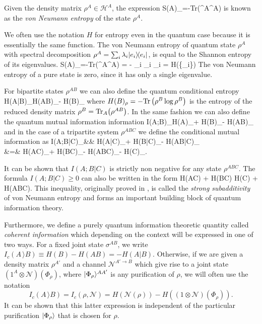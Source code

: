 \documentclass[aps,11pt,twoside,letterpaper]{article}
\def\Tr{\textup{Tr}}
\def\cH{\mathcal{H}}
\newcommand{\mcal}{\mathcal}
\begin{document}
		\begin{definition} 
			Given the density matrix $\rho^A \in \cH^A$, the expression
			\be
				S(A)_\rho=-\Tr\left(\rho^A\log\rho^A\right)
			\ee
			is known as the \emph{von Neumann entropy} of the state $\rho^A$. 
		\end{definition}
		
	            We often use the notation $H$ for entropy even in the quantum case because it is essentially
	            the same function.
	            The von Neumann entropy of quantum state $\rho^A$ 
	            with spectral decomposition $\rho^A = \sum_i \lambda_i | e_i \rangle\!\langle e_i |$, is
	            equal to the Shannon entropy of its eigenvalues.
	            \be
		            S(A)_\rho=-\Tr\left(\rho^A\log\rho^A\right) = - \sum_i \lambda_i \log \lambda_i = H(\{\lambda_i\})
	            \ee
  		   The von Neumann entropy of a pure state is zero, since it has only a single eigenvalue.

			
			For bipartite states $\rho^{AB}$ we can also define the quantum conditional entropy
			\be
				H(A|B)_\rho 	\triangleq 		H(AB)_\rho - H(B)_\rho					\label{cond-entrpy} 
			\ee
			where $H(B)_\rho = -\Tr\left(\rho^B\log\rho^B\right)$ is the entropy of the reduced density matrix
			$\rho^B = \Tr_A\!\left( \rho^{AB}\right)$. In the same fashion we can also define the 
			quantum mutual information information
			\be
				I(A;B)_\rho 	\triangleq		H(A)_\rho + H(B)_\rho - H(AB)_\rho 
			\ee
			and in the case of a tripartite system $\rho^{ABC}$ we define the conditional mutual information 
			as 
			\bea
				I(A;B|C)_\rho 	&\triangleq&	H(A|C)_\rho + H(B|C)_\rho - H(AB|C)_\rho \label{cond-mut-info} \\
								&=&		H(AC)_\rho + H(BC)_\rho - H(ABC)_\rho - H(C)_\rho.
			\eea
		    
			\noindent It can be shown that $I(A;B|C)$ is strictly non negative for any state $\rho^{ABC}$.
			The formula $I(A;B|C)\geq 0$ can also be written in the form
			\be	\label{strong-subadditivity}
				H(AC) + H(BC) 	\geq	H(C) + H(ABC).
			\ee
			This inequality, originally proved in \cite{LR73}, is called the \emph{strong subadditivity} of von Neumann 
			entropy and forms an important building block of quantum information theory.
			
			
			Furthermore, we define a purely quantum information theoretic quantity called \emph{coherent information}
			which depending on the context will be expressed in one of two ways.
			For a fixed joint state $\sigma^{AB}$, we write
			$I_c(A\,\rangle B) \equiv H(B) - H(AB) = -H(A|B).$
			Otherwise, if we are given a density matrix $\rho^{A'}$ and a channel $\mcal{N}^{A'\rightarrow B}$ which give rise to a joint state 
			$(1^A\otimes \mcal{N})(\Phi_\rho)$,
			where $| \Phi_\rho \rangle^{AA'}$ is any purification of $\rho$, we will often use the notation
			\[I_c(A\,\rangle B) = I_c(\rho,\mcal{N}) = H(\mcal{N}(\rho)) - H((1\otimes\mcal{N})(\Phi_\rho)).\]  
			It can be shown that this latter expression is independent of the particular purification $| \Phi_\rho \rangle$ that is chosen for $\rho$.
\end{document}
